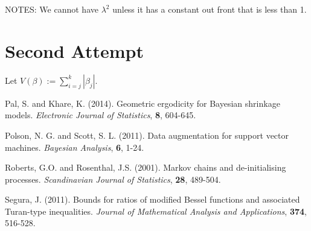 \documentclass[12pt]{article}
\begin{document}
NOTES: We cannot have $\lambda^2$ unless it has a constant out front that is less than 1.

\newpage

\section{Second Attempt}

Let $V(\beta) := \sum_{i=j}^{k}|\beta_j|$.


\newpage

\begin{thebibliography}{9}
    Pal, S. and Khare, K. (2014). Geometric ergodicity for Bayesian shrinkage models. \emph{Electronic Journal of Statistics}, \textbf{8}, 604-645.

    Polson, N. G. and Scott, S. L. (2011). Data augmentation for support vector machines. \emph{Bayesian Analysis}, \textbf{6}, 1-24.

    Roberts, G.O. and Rosenthal, J.S. (2001). Markov chains and de-initialising processes. \emph{Scandinavian Journal of Statistics}, \textbf{28},
    489-504.

    Segura, J. (2011). Bounds for ratios of modified Bessel functions and associated Turan-type inequalities. \emph{Journal of Mathematical Analysis
    and Applications}, \textbf{374}, 516-528.
\end{thebibliography}
\end{document}

